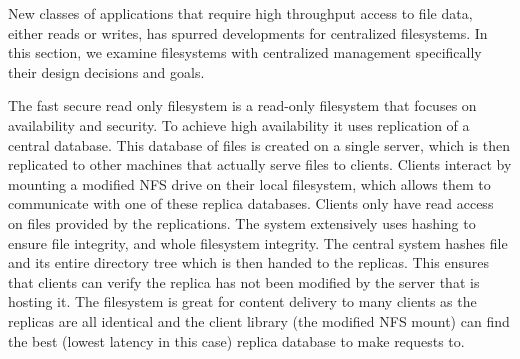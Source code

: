 New classes of applications that require high throughput access to file data, either reads or writes, has spurred developments for centralized filesystems. In this section, we examine filesystems with centralized management specifically their design decisions and goals.

The fast secure read only filesystem \cite{Fu2000} is a read-only filesystem
that focuses on availability and security. To achieve high availability it
uses replication of a central database. This database of files is created on a
single server, which is then replicated to other machines that actually serve
files to clients. Clients interact by mounting a modified NFS drive on their
local filesystem, which allows them to communicate with one of these replica
databases. Clients only have read access on files provided by the
replications. The system extensively uses hashing to ensure file integrity,
and whole filesystem integrity. The central system hashes file and its entire
directory tree which is then handed to the replicas. This ensures that clients
can verify the replica has not been modified by the server that is hosting it.
The filesystem is great for content delivery to many clients as the replicas
are all identical and the client library (the modified NFS mount) can find the
best (lowest latency in this case) replica database to make requests to.


